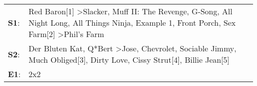 \begin{supertabular}{p{0.03\textwidth}p{0.92\textwidth}}
 \textbf{S1}:  &  Red Baron[1]\textsuperscript{} \textgreater \enspace Slacker\textsuperscript{}, \enspace Muff II: The Revenge\textsuperscript{}, \enspace G-Song\textsuperscript{}, \enspace All Night Long\textsuperscript{}, \enspace All Things Ninja\textsuperscript{}, \enspace Example 1\textsuperscript{}, \enspace Front Porch\textsuperscript{}, \enspace Sex Farm[2]\textsuperscript{} \textgreater \enspace Phil's Farm\textsuperscript{}  \enspace  \\
 \textbf{S2}:  &                                                            Der Bluten Kat\textsuperscript{}, \enspace Q*Bert\textsuperscript{} \textgreater \enspace Jose\textsuperscript{}, \enspace Chevrolet\textsuperscript{}, \enspace Sociable Jimmy\textsuperscript{}, \enspace Much Obliged[3]\textsuperscript{}, \enspace Dirty Love\textsuperscript{}, \enspace Cissy Strut[4]\textsuperscript{}, \enspace Billie Jean[5]\textsuperscript{}  \enspace  \\
 \textbf{E1}:  &                                                                                                                                                                                                                                                                                                                                                                                                                 2x2\textsuperscript{}  \enspace  \\
\end{supertabular}

